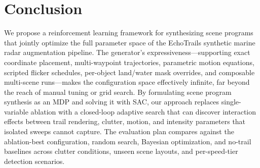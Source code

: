 \documentclass[12pt]{article}
\begin{document}
\section{Conclusion}

We propose a reinforcement learning framework for synthesizing scene programs that jointly optimize the full parameter space of the EchoTrails synthetic marine radar augmentation pipeline. The generator's expressiveness---supporting exact coordinate placement, multi-waypoint trajectories, parametric motion equations, scripted flicker schedules, per-object land/water mask overrides, and composable multi-scene runs---makes the configuration space effectively infinite, far beyond the reach of manual tuning or grid search. By formulating scene program synthesis as an MDP and solving it with SAC, our approach replaces single-variable ablation with a closed-loop adaptive search that can discover interaction effects between trail rendering, clutter, motion, and intensity parameters that isolated sweeps cannot capture. The evaluation plan compares against the ablation-best configuration, random search, Bayesian optimization, and no-trail baselines across clutter conditions, unseen scene layouts, and per-speed-tier detection scenarios.


\nocite{*}
\end{document}
